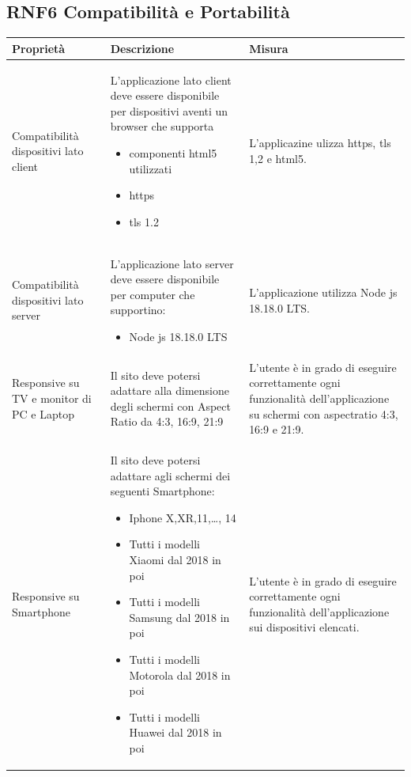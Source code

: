 \documentclass{report}
\begin{document}
\subsection*{RNF6 Compatibilità e Portabilità}
\begin{center} %
	\centering
	\begin{tabular}{ |p{3cm}|p{4cm}|p{4cm}|  }
		\hline
		\centering Proprietà & \qquad\quad Descrizione & \qquad\qquad Misura\\ %
		\hline
		Compatibilità dispositivi lato client & L'applicazione lato client  deve essere disponibile per dispositivi aventi un browser che supporta \begin{itemize}
		\item componenti html5 utilizzati
		\item https
		\item tls 1.2
		\end{itemize} &  L'applicazine ulizza https, tls 1,2 e html5.  \\
		\hline
		Compatibilità dispositivi lato server & L'applicazione lato server deve essere disponibile per computer che supportino: 
		\begin{itemize}
			\item Node js 18.18.0 LTS
		\end{itemize}
		&  L'applicazione utilizza Node js 18.18.0 LTS. \\
		\hline 
		Responsive su TV e monitor di PC e Laptop & Il sito deve potersi adattare alla dimensione degli schermi con Aspect Ratio da 4:3, 16:9, 21:9 & L'utente è in grado di eseguire correttamente ogni funzionalità dell'applicazione su schermi con aspectratio 4:3, 16:9 e 21:9. \\
		\hline
		Responsive su Smartphone & Il sito deve potersi adattare agli schermi dei seguenti Smartphone: 
		\begin{itemize}
			\item Iphone X,XR,11,\dots , 14
			\item Tutti i modelli Xiaomi dal 2018 in poi 
			\item Tutti i modelli Samsung dal 2018 in poi
			\item Tutti i modelli Motorola dal 2018 in poi 
			\item Tutti i modelli Huawei dal 2018 in poi 
		\end{itemize}
		&  L'utente è in grado di eseguire correttamente ogni funzionalità dell'applicazione sui dispositivi elencati. \\
		
		\hline
		
	\end{tabular}
\end{center}
\end{document}
